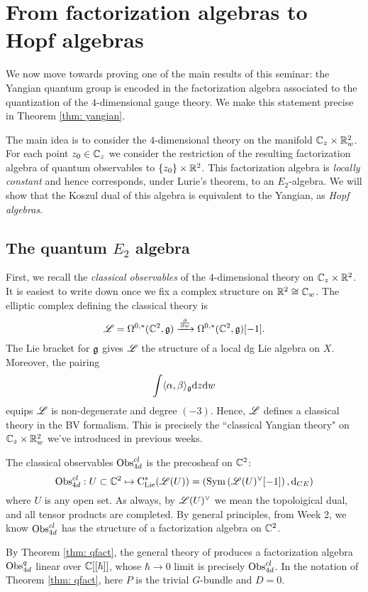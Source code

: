 \documentclass[11pt]{amsart}
\begin{document}
\section{From factorization algebras to Hopf algebras}

We now move towards proving one of the main results of this seminar: the Yangian quantum group is encoded in the factorization algebra associated to the quantization of the $4$-dimensional gauge theory. 
We make this statement precise in Theorem \ref{thm: yangian}. 

The main idea is to consider the $4$-dimensional theory on the manifold $\mathbb C_z \times \mathbb R^2_w$. 
For each point $z_0 \in \mathbb C_z$ we consider the restriction of the resulting factorization algebra of quantum observables to $\{z_0\} \times \mathbb R^2$. 
This factorization algebra is {\em locally constant} and hence corresponds, under Lurie's theorem, to an $E_2$-algebra. 
We will show that the Koszul dual of this algebra is equivalent to the Yangian, as {\em Hopf algebras}. 

\subsection{The quantum $E_2$ algebra}

First, we recall the {\em classical observables} of the $4$-dimensional theory on $\mathbb C_z \times \mathbb R^2$. 
It is easiest to write down once we fix a complex structure on $\mathbb R^2 \cong \mathbb C_w$. 
The elliptic complex defining the classical theory is
\[
\mathscr L = \Omega^{0,*}(\mathbb C^2 , \mathfrak g) \xrightarrow{\frac{\partial}{\partial w}} \Omega^{0,*}(\mathbb C^2, \mathfrak g)[-1] .
\] 
The Lie bracket for $\mathfrak g$ gives $\mathscr L$ the structure of a local dg Lie algebra on $X$. 
Moreover, the pairing
\[
\int \langle\alpha, \beta\rangle_\mathfrak g {\rm d} z {\rm d} w
\]
equips $\mathscr L$ is non-degenerate and degree $(-3)$. 
Hence, $\mathscr L$ defines a classical theory in the BV formalism. 
This is precisely the ``classical Yangian theory" on $\mathbb C_z \times \mathbb R^2_w$ we've introduced in previous weeks. 

The classical observables ${\rm Obs}^{cl}_{4d}$ is the precosheaf on $\mathbb C^2$:
\[
{\rm Obs}^{cl}_{4d} : U \subset \mathbb C^2 \mapsto {\rm C}_{{\rm Lie}}^*(\mathscr L(U)) = \left({\rm Sym} \left(\mathscr L(U)^\vee[-1]\right), {\rm d}_{CE}\right) 
\]
where $U$ is any open set. 
As always, by $\mathscr L(U)^\vee$ we mean the topoloigical dual, and all tensor products are completed. 
By general principles, from Week 2, we know ${\rm Obs}^{cl}_{4d}$ has the structure of a factorization algebra on $\mathbb C^2$. 

By Theorem \ref{thm: qfact}, the general theory of \cite{CG2} produces a factorization algebra ${\rm Obs}^{q}_{4d}$ linear over $\mathbb C[[\hbar]]$, whose $\hbar \to 0$ limit is precisely ${\rm Obs}^{cl}_{4d}$. 
In the notation of Theorem \ref{thm: qfact}, here $P$ is the trivial $G$-bundle and $D = 0$. 
\end{document}
